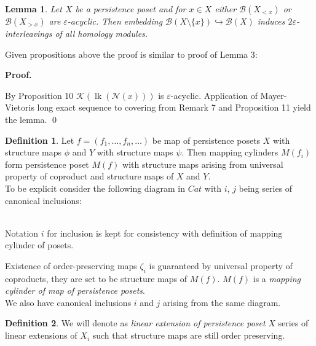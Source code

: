 \documentclass[a4paper, 12pt]{article}
\newtheorem{lemma}{Lemma}
\theoremstyle{definition}
\newtheorem{definition}{Definition}
\theoremstyle{remark}
\newenvironment{pf}{\noindent\textbf{Proof.}}{\qed}
\newcommand{\define}[1]{{\textit{#1}}}
\begin{document}
\begin{lemma}
  Let $X$ be a persistence poset and for $x \in X$ either $\mathcal{B}(X_{< x})$ or $\mathcal{B}(X_{> x})$ are $\varepsilon$-acyclic. Then embedding $\mathcal{B}(X \setminus \{x\}) \hookrightarrow \mathcal{B}(X)$ induces $2\varepsilon$-interleavings of all homology modules.
\end{lemma}

Given propositions above the proof is similar to proof of Lemma 3:

\begin{pf} ~ \par
 By Proposition 10 $\mathcal{K}(\operatorname{lk}(\mathcal{N}(x)))$ is $\varepsilon$-acyclic.
 Application of Mayer-Vietoris long exact sequence to covering from Remark 7 and Proposition 11 yield the lemma.
\end{pf}

\begin{definition}
  Let $f = (f_1,\ldots,f_n,\ldots)$ be map of persistence posets $X$ with structure maps $\phi$ and $Y$ with structure maps $\psi$. Then mapping cylinders $M(f_i)$ form persistence poset $M(f)$ with structure maps arising from universal property of coproduct and structure maps of $X$ and $Y$.\\

  To be explicit consider the following diagram in $Cat$ with $i$, $j$ being series of canonical inclusions:\\
  \\
  Notation $i$ for inclusion is kept for consistency with definition of mapping cylinder of posets.

  Existence of order-preserving maps $\zeta_i$ is guaranteed by universal property of coproducts, they are set to be structure maps of $M(f)$. $M(f)$ is a \define{mapping cylinder of map of persistence posets}.\\

  We also have canonical inclusions $i$ and $j$ arising from the same diagram.
\end{definition}

\begin{definition}
  We will denote as \define{linear extension of persistence poset} $X$ series of linear extensions of $X_i$ such that structure maps are still order preserving.
\end{definition}
\end{document}
